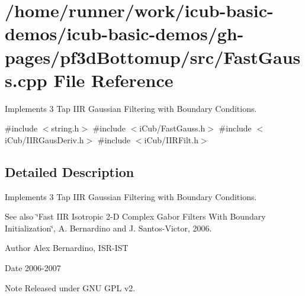 \section{/home/runner/work/icub-\/basic-\/demos/icub-\/basic-\/demos/gh-\/pages/pf3d\+Bottomup/src/\+Fast\+Gauss.cpp File Reference}
\label{FastGauss_8cpp}


Implements 3 Tap I\+IR Gaussian Filtering with Boundary Conditions.  


{\ttfamily \#include $<$string.\+h$>$}\newline
{\ttfamily \#include $<$i\+Cub/\+Fast\+Gauss.\+h$>$}\newline
{\ttfamily \#include $<$i\+Cub/\+I\+I\+R\+Gaus\+Deriv.\+h$>$}\newline
{\ttfamily \#include $<$i\+Cub/\+I\+I\+R\+Filt.\+h$>$}\newline


\subsection{Detailed Description}
Implements 3 Tap I\+IR Gaussian Filtering with Boundary Conditions. 

\begin{DoxySeeAlso}{See also}
\char`\"{}\+Fast I\+I\+R Isotropic 2-\/\+D Complex Gabor Filters With Boundary Initialization\char`\"{}, A. Bernardino and J. Santos-\/\+Victor, 2006. 
\end{DoxySeeAlso}
\begin{DoxyAuthor}{Author}
Alex Bernardino, I\+S\+R-\/\+I\+ST 
\end{DoxyAuthor}
\begin{DoxyDate}{Date}
2006-\/2007 
\end{DoxyDate}
\begin{DoxyNote}{Note}
Released under G\+NU G\+PL v2. 
\end{DoxyNote}
